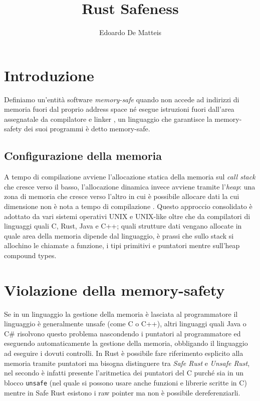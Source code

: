 \documentclass{article}
\title{Rust Safeness}
\author{Edoardo De Matteis}
\begin{document}
\maketitle
\tableofcontents

\clearpage 

\section{Introduzione}
Definiamo un'entità software \emph{memory-safe} quando non accede ad indirizzi di memoria fuori dal proprio address space né esegue istruzioni fuori dall'area assegnatale da compilatore e linker \cite{paper:def}, un linguaggio che garantisce la memory-safety dei suoi programmi è detto memory-safe.

\subsection{Configurazione della memoria}
A tempo di compilazione avviene l'allocazione statica della memoria sul \emph{call stack} che cresce verso il basso, l'allocazione dinamica invece avviene tramite l'\emph{heap}: una zona di memoria che cresce verso l'altro in cui è possibile allocare dati la cui dimensione non è nota a tempo di compilazione \cite{gollmann:computersecurity}. Questo approccio consolidato è adottato da vari sistemi operativi UNIX e UNIX-like oltre che da compilatori di linguaggi quali C, Rust, Java e C++; quali strutture dati vengano allocate in quale area della memoria dipende dal linguaggio, è prassi che sullo stack si allochino le chiamate a funzione, i tipi primitivi e puntatori mentre sull'heap compound types.

\section{Violazione della memory-safety}
Se in un linguaggio la gestione della memoria è lasciata al programmatore il linguaggio è generalmente unsafe (come C o C++), altri linguaggi quali Java o C\# risolvono questo problema nascondendo i puntatori al programmatore ed eseguendo automaticamente la gestione della memoria, obbligando il linguaggio ad eseguire i dovuti controlli. In Rust è possibile fare riferimento esplicito alla memoria tramite puntatori ma bisogna distinguere tra \emph{Safe Rust} e \emph{Unsafe Rust}, nel secondo è infatti presente l'aritmetica dei puntatori del C purché sia in un blocco \texttt{unsafe} (nel quale si possono usare anche funzioni e librerie scritte in C) mentre in Safe Rust esistono i raw pointer ma non è possibile dereferenziarli.  
\end{document}
